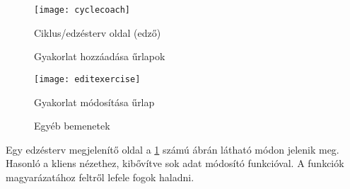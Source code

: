\begin{figure}[H]
	\centering
	\texttt{[image: cyclecoach]}
	\caption{Ciklus/edzésterv oldal (edző)}
	\label{fig:cyclecoach}
\end{figure}

\begin{figure}[H]
	\centering
	\hspace{5pt}
	\caption{Gyakorlat hozzáadása űrlapok}
	\label{fig:addrexercise}
\end{figure}

\begin{figure}[H]
	\centering
	\texttt{[image: editexercise]}
	\caption{Gyakorlat módosítása űrlap}
	\label{fig:editexercise}
\end{figure}

\begin{figure}[H]
	\centering
	\hspace{5pt}
	\caption{Egyéb bemenetek}
	\label{fig:addrexercise}
\end{figure}



Egy edzésterv megjelenítő oldal a \ref{fig:cyclecoach} számú ábrán látható módon jelenik meg. Hasonló a kliens nézethez, kibővítve sok adat módosító funkcióval. A funkciók magyarázatához feltről lefele fogok haladni.

